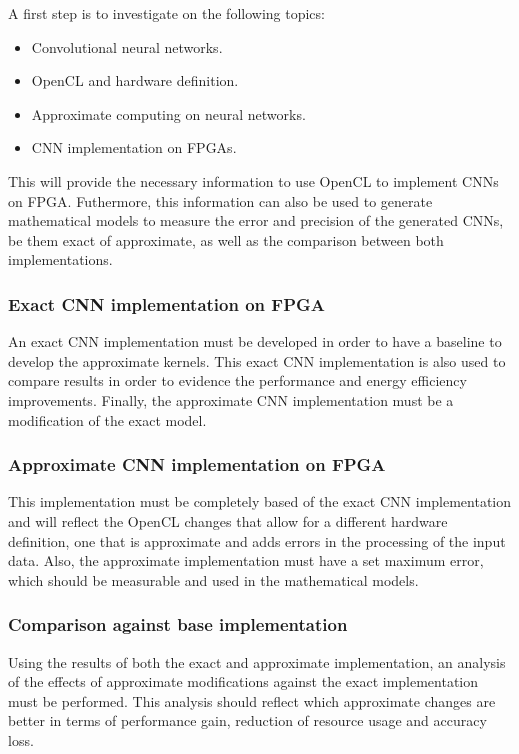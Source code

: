 A first step is to investigate on the following topics:

\begin{itemize}
    \item Convolutional neural networks.
    \item OpenCL and hardware definition.
    \item Approximate computing on neural networks.
    \item CNN implementation on FPGAs.
\end{itemize}

This will provide the necessary information to use OpenCL to implement CNNs on FPGA.
Futhermore, this information can also be used to generate mathematical models to measure the error
and precision of the generated CNNs, be them exact of approximate, as well as the comparison between
both implementations.

\subsubsection{Exact CNN implementation on FPGA}

An exact CNN implementation must be developed in order to have a baseline
to develop the approximate kernels. This exact CNN implementation is also used to
compare results in order to evidence the performance and energy efficiency improvements.
Finally, the approximate CNN implementation must be a modification of the exact model.

\subsubsection{Approximate CNN implementation on FPGA}

This implementation must be completely based of the exact CNN implementation and will 
reflect the OpenCL changes that allow for a different hardware definition, one that is 
approximate and adds errors in the processing of the input data. Also, the approximate
implementation must have a set maximum error, which should be measurable and used
in the mathematical models.

\subsubsection{Comparison against base implementation}

Using the results of both the exact and approximate implementation, an analysis of
the effects of approximate modifications against the exact implementation must be performed.
This analysis should reflect which approximate changes are better in terms of performance gain,
reduction of resource usage and accuracy loss.

